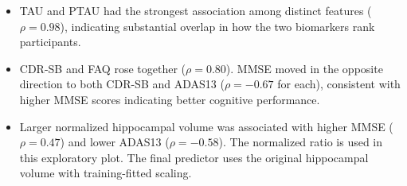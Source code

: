 \begin{itemize}
\item TAU and PTAU had the strongest association among distinct features ($\rho=0.98$), indicating substantial overlap in how the two biomarkers rank participants.
\item CDR-SB and FAQ rose together ($\rho=0.80$). MMSE moved in the opposite direction to both CDR-SB and ADAS13 ($\rho=-0.67$ for each), consistent with higher MMSE scores indicating better cognitive performance.
\item Larger normalized hippocampal volume was associated with higher MMSE ($\rho=0.47$) and lower ADAS13 ($\rho=-0.58$). The normalized ratio is used in this exploratory plot. The final predictor uses the original hippocampal volume with training-fitted scaling.
\end{itemize}

